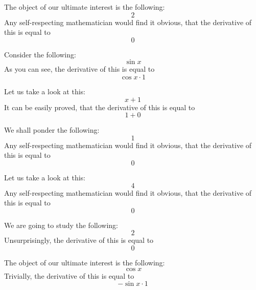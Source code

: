 \documentclass{article}
\begin{document}
The object of our ultimate interest is the following:
\begin{equation}
2 
\end{equation}
Any self-respecting mathematician would find it obvious, that the derivative of this is equal to
\begin{equation}
0 
\end{equation}

Consider the following:
\begin{equation}
\sin x 
\end{equation}
As you can see, the derivative of this is equal to
\begin{equation}
\cos x \cdot 1 
\end{equation}

Let us take a look at this:
\begin{equation}
x + 1 
\end{equation}
It can be easily proved, that the derivative of this is equal to
\begin{equation}
1 + 0 
\end{equation}

We shall ponder the following:
\begin{equation}
1 
\end{equation}
Any self-respecting mathematician would find it obvious, that the derivative of this is equal to
\begin{equation}
0 
\end{equation}

Let us take a look at this:
\begin{equation}
4 
\end{equation}
Any self-respecting mathematician would find it obvious, that the derivative of this is equal to
\begin{equation}
0 
\end{equation}

We are going to study the following:
\begin{equation}
2 
\end{equation}
Unsurprisingly, the derivative of this is equal to
\begin{equation}
0 
\end{equation}

The object of our ultimate interest is the following:
\begin{equation}
\cos x 
\end{equation}
Trivially, the derivative of this is equal to
\begin{equation}
-\sin x \cdot 1 
\end{equation}
\end{document}
